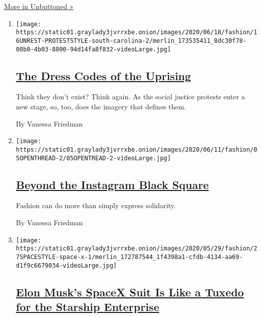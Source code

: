 \href{/column/unbuttoned}{More in Unbuttoned »}

\begin{enumerate}
\def\labelenumi{\arabic{enumi}.}
\item
  \texttt{[image: https://static01.graylady3jvrrxbe.onion/images/2020/06/18/fashion/16UNREST-PROTESTSTYLE-south-carolina-2/merlin\_173535411\_8dc30f78-08b0-4b03-8800-94d14fa8f832-videoLarge.jpg]}

  \hypertarget{the-dress-codes-of-the-uprising}{%
  \subsection{\texorpdfstring{\href{/2020/06/16/fashion/the-dress-codes-of-the-uprising.html}{The
  Dress Codes of the
  Uprising}}{The Dress Codes of the Uprising}}\label{the-dress-codes-of-the-uprising}}

  Think they don't exist? Think again. As the social justice protests
  enter a new stage, so, too, does the imagery that defines them.

  By Vanessa Friedman
\item
  \texttt{[image: https://static01.graylady3jvrrxbe.onion/images/2020/06/11/fashion/05OPENTHREAD-2/05OPENTREAD-2-videoLarge.jpg]}

  \hypertarget{beyond-the-instagram-black-square}{%
  \subsection{\texorpdfstring{\href{/2020/06/06/style/fashion-racism-actions.html}{Beyond
  the Instagram Black
  Square}}{Beyond the Instagram Black Square}}\label{beyond-the-instagram-black-square}}

  Fashion can do more than simply express solidarity.

  By Vanessa Friedman
\item
  \texttt{[image: https://static01.graylady3jvrrxbe.onion/images/2020/05/29/fashion/27SPACESTYLE-space-x-1/merlin\_172787544\_1f4398a1-cfdb-4134-aa69-d1f9c6679034-videoLarge.jpg]}

  \hypertarget{elon-musks-spacex-suit-is-like-a-tuxedo-for-the-starship-enterprise}{%
  \subsection{\texorpdfstring{\href{/2020/05/27/fashion/SpaceX-Dragon-Suits.html}{Elon
  Musk's SpaceX Suit Is Like a Tuxedo for the Starship
  Enterprise}}{Elon Musk's SpaceX Suit Is Like a Tuxedo for the Starship Enterprise}}\label{elon-musks-spacex-suit-is-like-a-tuxedo-for-the-starship-enterprise}}


\end{enumerate}
